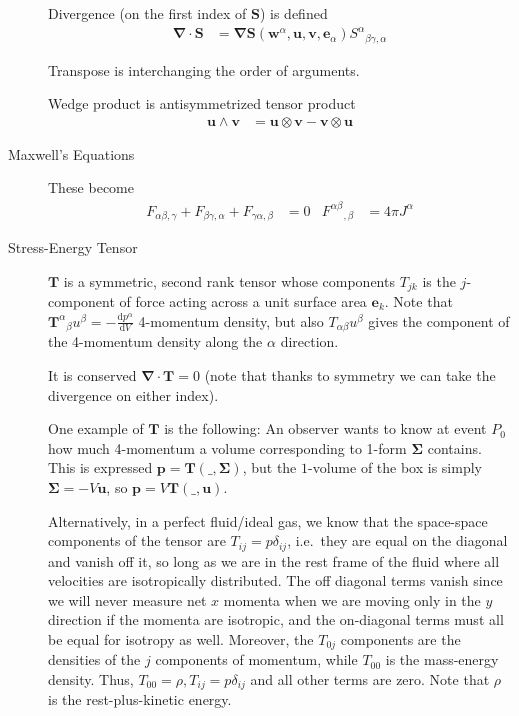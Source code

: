 \documentclass[12pt]{report}
\newcommand{\rd}[2]{\frac{\mathrm{d}#1}{\mathrm{d}#2}}
\begin{document}
\begin{description}
        Divergence (on the first index of $\mathbf{S}$) is defined
        \begin{align}
            \mathbf{\nabla} \cdot \mathbf{S} &= \mathbf{\nabla} \mathbf{S}
                (\mathbf{w}^\alpha, \mathbf{u}, \mathbf{v}, \mathbf{e}_\alpha)
            {S^{\alpha}}_{\beta\gamma,\alpha}
        \end{align}

        Transpose is interchanging the order of arguments.

        Wedge product is antisymmetrized tensor product
        \begin{align}
            \mathbf{u} \wedge \mathbf{v} &= \mathbf{u} \otimes \mathbf{v} -
                \mathbf{v} \otimes \mathbf{u}
        \end{align}

    \item[Maxwell's Equations] These become
        \begin{align}
            F_{\alpha\beta,\gamma} + F_{\beta\gamma, \alpha} +
            F_{\gamma\alpha,\beta} &= 0 &
            {F^{\alpha\beta}}_{,\beta} &= 4\pi J^\alpha
        \end{align}

    \item[Stress-Energy Tensor] $\mathbf{T}$ is a symmetric, second rank tensor
        whose components $T_{jk}$ is the $j$-component of force acting across a
        unit surface area $\mathbf{e}_k$. Note that ${\mathbf{T}^\alpha}_\beta
        u^\beta = -\rd{p^\alpha}{V}$ 4-momentum density, but also
        $T_{\alpha\beta} u^\beta$ gives the component of the 4-momentum density
        along the $\alpha$ direction.

        It is conserved $\mathbf{\nabla} \cdot \mathbf{T} = 0$ (note that thanks
        to symmetry we can take the divergence on either index).

        One example of $\mathbf{T}$ is the following: An observer wants to know
        at event $P_0$ how much 4-momentum a volume corresponding to 1-form
        $\mathbf{\Sigma}$ contains. This is expressed $\mathbf{p} =
        \mathbf{T}(\_, \mathbf{\Sigma})$, but the $1$-volume of the box is
        simply $\mathbf{\Sigma} = -V \mathbf{u}$, so $\mathbf{p} = V
        \mathbf{T}(\_, \mathbf{u})$.

        Alternatively, in a perfect fluid/ideal gas, we know that the
        space-space components of the tensor are $T_{ij} = p\delta_{ij}$, i.e.\
        they are equal on the diagonal and vanish off it, so long as we are in
        the rest frame of the fluid where all velocities are isotropically
        distributed. The off diagonal terms vanish since we will never measure
        net $x$ momenta when we are moving only in the $y$ direction if the
        momenta are isotropic, and the on-diagonal terms must all be equal for
        isotropy as well. Moreover, the $T_{0j}$ components are the densities of
        the $j$ components of momentum, while $T_{00}$ is the mass-energy
        density. Thus, $T_{00} = \rho, T_{ij} = p\delta_{ij}$ and all other
        terms are zero. Note that $\rho$ is the rest-plus-kinetic energy.


\end{description}
\end{document}
